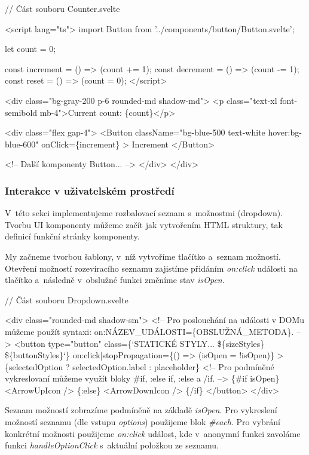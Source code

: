 \begin{prog}
// Část souboru Counter.svelte

<script lang="ts">
  import Button from '../components/button/Button.svelte';

  let count = 0;

  const increment = () => (count += 1);
  const decrement = () => (count -= 1);
  const reset = () => (count = 0);
</script>

<div class="bg-gray-200 p-6 rounded-md shadow-md">
  <p class="text-xl font-semibold mb-4">Current count: \{count\}</p>

  <div class="flex gap-4">
    <Button 
      className="bg-blue-500 text-white hover:bg-blue-600" 
      onClick=\{increment\}
    >
      Increment
    </Button>

    <!-- Další komponenty Button... -->
  </div>
</div>
\end{prog}

\subsubsection*{Interakce v uživatelském prostředí}

V~této sekci implementujeme rozbalovací seznam s~možnostmi (dropdown). Tvorbu UI komponenty můžeme začít jak vytvořením HTML struktury, tak definicí funkční stránky komponenty.

My začneme tvorbou šablony, v~níž vytvoříme tlačítko a~seznam možností. 
Otevření možností rozevíracího seznamu zajistíme přidáním \emph{on:click} události na tlačítko a~následně v~obslužné funkci změníme stav \emph{isOpen}.

\begin{prog}
// Část souboru Dropdown.svelte

<div class="rounded-md shadow-sm">
  <!-- Pro poslouchání na události v DOMu můžeme použít syntaxi: 
    on:NÁZEV_UDÁLOSTI=\{OBSLUŽNÁ_METODA\}. -->
  <button
    type="button"
    class=\{`STATICKÉ STYLY... \$\{sizeStyles\} \$\{buttonStyles\}`\}
    on:click|stopPropagation=\{() => (isOpen = !isOpen)\}
  >
    \{selectedOption ? selectedOption.label : placeholder\}
    <!-- Pro podmíněné vykreslovaní můžeme využít bloky
      #if, :else if, :else a /if. -->
    \{#if isOpen\}
      <ArrowUpIcon />
    \{:else\}
      <ArrowDownIcon />
    \{/if\}
  </button>
</div>
\end{prog}

Seznam možností zobrazíme podmíněně na základě \emph{isOpen}. Pro vykreslení možností seznamu (dle vstupu \emph{options}) použijeme blok \emph{\#each}. 
Pro vybrání konkrétní možnosti použijeme \emph{on:click} událost, kde v~anonymní funkci zavoláme funkci \emph{handleOptionClick} s~aktuální položkou ze seznamu.


